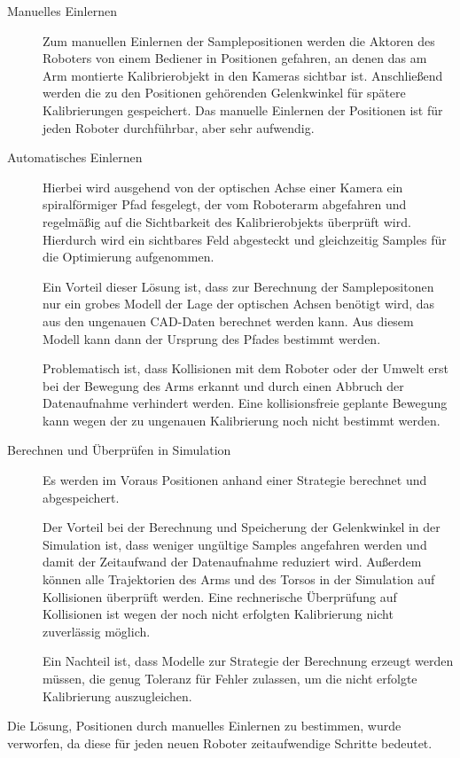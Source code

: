\begin{description}
\item[Manuelles Einlernen]
    \label{ssub:Manuelles Einlernen}
    Zum manuellen Einlernen der Samplepositionen werden die Aktoren des Roboters
    von einem Bediener in Positionen gefahren, an denen das am Arm montierte
    Kalibrierobjekt in den Kameras sichtbar ist. Anschließend werden die zu den
    Positionen gehörenden Gelenkwinkel für spätere Kalibrierungen gespeichert.
    Das manuelle Einlernen der Positionen ist für jeden Roboter durchführbar, 
    aber sehr aufwendig.



  \item[Automatisches Einlernen]
    \label{ssub:Abfahren und Überprüfen eines Pfades}
    Hierbei wird ausgehend von der optischen Achse einer Kamera ein spiralförmiger
    Pfad fesgelegt, der vom Roboterarm abgefahren 
    und regelmäßig auf die Sichtbarkeit des Kalibrierobjekts überprüft wird. Hierdurch
    wird ein sichtbares Feld abgesteckt und gleichzeitig Samples für die 
    Optimierung aufgenommen.

    Ein Vorteil dieser Lösung ist, dass zur Berechnung
    der Samplepositonen nur ein grobes Modell der Lage der optischen Achsen benötigt
    wird, das aus den ungenauen CAD-Daten berechnet werden kann. Aus diesem Modell
    kann dann der Ursprung des Pfades bestimmt werden. 

    Problematisch ist, dass Kollisionen mit dem Roboter oder der Umwelt erst bei
    der Bewegung des Arms erkannt und durch einen Abbruch der Datenaufnahme 
    verhindert werden. Eine kollisionsfreie geplante Bewegung kann wegen der zu 
    ungenauen Kalibrierung noch nicht bestimmt werden.




  \item[Berechnen und Überprüfen in Simulation]
    \label{ssub:Berechnen und Überprüfen der Samples in Simulation}

    Es werden im Voraus Positionen anhand einer Strategie berechnet und abgespeichert.

    Der Vorteil bei der Berechnung und Speicherung der
    Gelenkwinkel in der Simulation ist, dass weniger ungültige Samples angefahren werden
    und damit der Zeitaufwand der Datenaufnahme reduziert wird. Außerdem können alle
    Trajektorien des Arms und des Torsos in der Simulation auf Kollisionen überprüft
    werden.
    Eine rechnerische Überprüfung auf Kollisionen ist wegen der noch nicht 
    erfolgten Kalibrierung nicht zuverlässig möglich. 
    
    Ein Nachteil ist, dass
    Modelle zur Strategie der Berechnung erzeugt werden müssen, die genug Toleranz für Fehler zulassen, um die 
    nicht erfolgte Kalibrierung auszugleichen.

\end{description}
Die Lösung, Positionen durch manuelles Einlernen zu bestimmen, wurde verworfen,
da diese für jeden neuen Roboter zeitaufwendige Schritte bedeutet.


